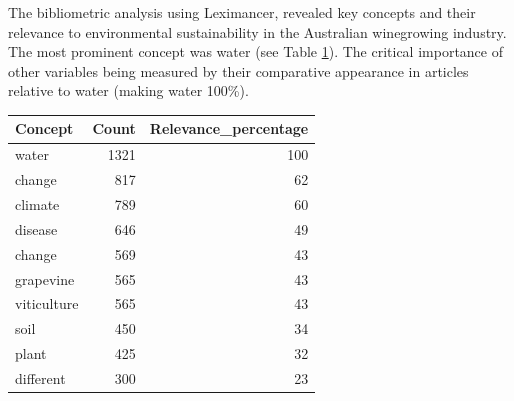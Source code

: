 The bibliometric analysis using Leximancer, revealed key concepts and their relevance to environmental sustainability in the Australian winegrowing industry. The most prominent concept was water (see Table \ref{tab:lexi}). The critical importance of other variables being measured by their comparative appearance in articles relative to water (making water 100\%).


\begin{table}[h]\label{tab:lexi}
    \begin{tabular}{@{}lrr@{}}
    \toprule
    \textbf{Concept} & \multicolumn{1}{l}{\textbf{Count}} & \multicolumn{1}{l}{\textbf{Relevance_percentage}} \\ \midrule
    water & 1321 & 100 \\
    change & 817 & 62 \\
    climate & 789 & 60 \\
    disease & 646 & 49 \\
    change & 569 & 43 \\
    grapevine & 565 & 43 \\
    viticulture & 565 & 43 \\
    soil & 450 & 34 \\
    plant & 425 & 32 \\
    different & 300 & 23 \\ \bottomrule
    \end{tabular}
    \end{table}

% 

